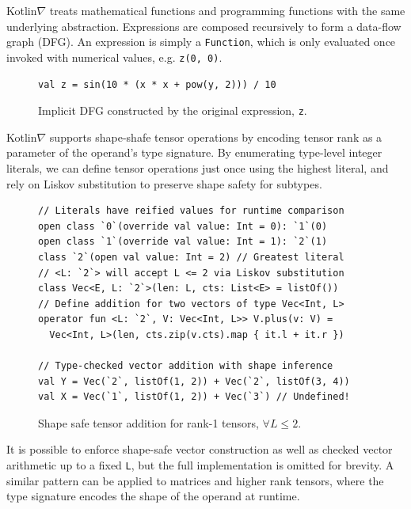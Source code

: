 \documentclass{article}
\begin{document}
Kotlin$\nabla$ treats mathematical functions and programming functions with the same underlying abstraction. Expressions are composed recursively to form a data-flow graph (DFG). An expression is simply a \texttt{Function}, which is only evaluated once invoked with numerical values, e.g. \texttt{z(0, 0)}.

\squeezeup\begin{figure}[!htb]
\centering
\begin{lstlisting}[basicstyle=\ttfamily\small]
 val z = sin(10 * (x * x + pow(y, 2))) / 10
\end{lstlisting}
\squeezeup\centering
{}
\squeezeup\squeezeup\squeezeup\caption{Implicit DFG constructed by the original expression, \texttt{z}.}
\end{figure}

\squeezeup Kotlin$\nabla$ supports shape-shafe tensor operations by encoding tensor rank as a parameter of the operand's type signature. By enumerating type-level integer literals, we can define tensor operations just once using the highest literal, and rely on Liskov substitution to preserve shape safety for subtypes.

\squeezeup\begin{figure}[!htb]
\begin{lstlisting}
// Literals have reified values for runtime comparison
open class `0`(override val value: Int = 0): `1`(0)
open class `1`(override val value: Int = 1): `2`(1)
class `2`(open val value: Int = 2) // Greatest literal
// <L: `2`> will accept L <= 2 via Liskov substitution
class Vec<E, L: `2`>(len: L, cts: List<E> = listOf())
// Define addition for two vectors of type Vec<Int, L>
operator fun <L: `2`, V: Vec<Int, L>> V.plus(v: V) =
  Vec<Int, L>(len, cts.zip(v.cts).map { it.l + it.r })

// Type-checked vector addition with shape inference
val Y = Vec(`2`, listOf(1, 2)) + Vec(`2`, listOf(3, 4))
val X = Vec(`1`, listOf(1, 2)) + Vec(`3`) // Undefined!
\end{lstlisting}
\squeezeup\squeezeup\caption{Shape safe tensor addition for rank-1 tensors, $\forall L\leq2.$}\squeezeup
\end{figure}
\squeezeup
It is possible to enforce shape-safe vector construction as well as checked vector arithmetic up to a fixed \texttt{L}, but the full implementation is omitted for brevity. A similar pattern can be applied to matrices and higher rank tensors, where the type signature encodes the shape of the operand at runtime.
\end{document}
